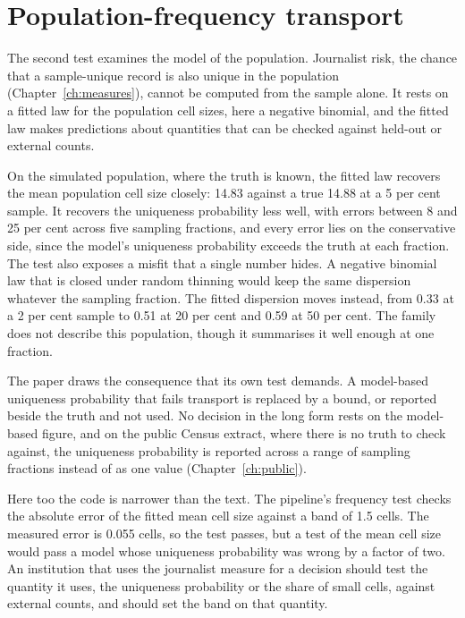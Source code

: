 \section{Population-frequency transport}

The second test examines the model of the population. Journalist risk, the chance
that a sample-unique record is also unique in the population
(Chapter~\ref{ch:measures}), cannot be computed from the sample alone. It rests on a
fitted law for the population cell sizes, here a negative binomial, and the fitted
law makes predictions about quantities that can be checked against held-out or
external counts.

On the simulated population, where the truth is known, the fitted law recovers the
mean population cell size closely: 14.83 against a true 14.88 at a 5 per cent
sample. %
It recovers the uniqueness probability less well, with errors between 8 and 25 per
cent across five sampling fractions, and every error lies on the conservative side,
since the model's uniqueness probability exceeds the truth at each fraction.
The test also exposes a misfit that a single number hides. A negative binomial law
that is closed under random thinning would keep the same dispersion whatever the
sampling fraction. The fitted dispersion moves instead, from 0.33 at a 2 per cent
sample to 0.51 at 20 per cent and 0.59 at 50 per cent.
The family does not describe this population, though it summarises it well enough
at one fraction.

The paper draws the consequence that its own test demands. A model-based
uniqueness probability that fails transport is replaced by a bound, or reported
beside the truth and not used. No decision in the long form rests on the
model-based figure, and on the public Census extract, where there is no truth to
check against, the uniqueness probability is reported across a range of sampling
fractions instead of as one value (Chapter~\ref{ch:public}).

Here too the code is narrower than the text. The pipeline's frequency test checks
the absolute error of the fitted mean cell size against a band of 1.5 cells.
The measured error is 0.055 cells, so the test passes, but a test of the mean cell
size would pass a model whose uniqueness probability was wrong by a factor of two.
An institution that uses the journalist measure for a decision should test the
quantity it uses, the uniqueness probability or the share of small cells, against
external counts, and should set the band on that quantity.

